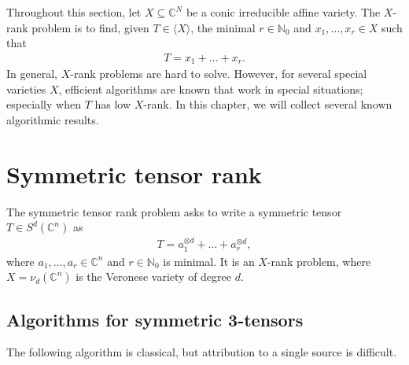 
Throughout this section, let $ X \subseteq \mathbb C^N  $ be a conic irreducible affine variety. 
The $ X $-rank problem is to find, given $ T\in \langle X \rangle $, the minimal $ r\in \mathbb N_0 $ and $ x_1,\ldots,x_r \in X $ such that 
\begin{align*}
	T = x_1 + \ldots + x_r. 
\end{align*}
In general, $ X $-rank problems are hard to solve. However, for several special varieties $ X $, efficient algorithms are known that work in special situations; especially when $ T $ has low $ X $-rank. 
In this chapter, we will collect several known algorithmic results. 


\section{Symmetric tensor rank}
The symmetric tensor rank problem asks to write a symmetric tensor $ T\in S^d(\mathbb C^n) $ as
\begin{align*}
	T = a_1^{\otimes d} + \ldots + a_r^{\otimes d}, 
\end{align*}
where $ a_1,\ldots,a_r\in \mathbb C^n $ and $ r \in \mathbb{N}_0$ is minimal. It is an $ X $-rank problem, where $ X = \nu_d(\mathbb C^n) $ is the Veronese variety of degree $ d $. %



\subsection{Algorithms for symmetric 3-tensors}


The following algorithm is classical, but attribution to a single source is difficult. %


